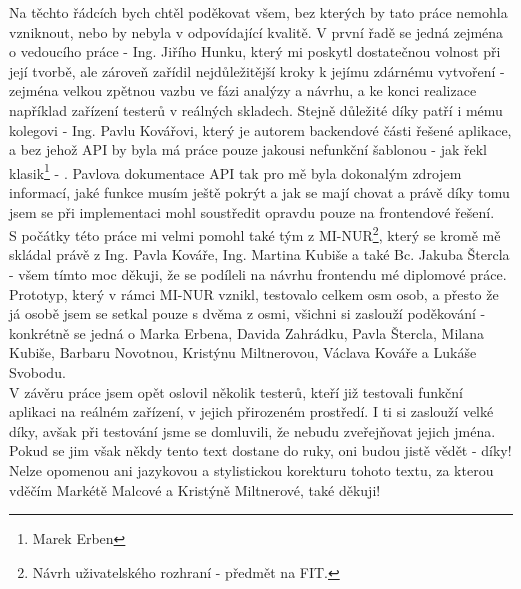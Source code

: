 Na těchto řádcích bych chtěl poděkovat všem, bez kterých by tato práce nemohla vzniknout, nebo by nebyla v odpovídající kvalitě. V první řadě se jedná zejména o vedoucího práce - Ing. Jiřího Hunku, který mi poskytl dostatečnou volnost při její tvorbě, ale zároveň zařídil nejdůležitější kroky k jejímu zdárnému vytvoření - zejména velkou zpětnou vazbu ve fázi analýzy a návrhu, a ke konci realizace například zařízení testerů v reálných skladech. Stejně důležité díky patří i mému kolegovi - Ing. Pavlu Kovářovi, který je autorem backendové části řešené aplikace, a bez jehož API by byla má práce pouze jakousi nefunkční šablonou - jak řekl klasik\footnote{Marek Erben} - . Pavlova dokumentace API tak pro mě byla dokonalým zdrojem informací, jaké funkce musím ještě pokrýt a jak se mají chovat a právě díky tomu jsem se při implementaci mohl soustředit opravdu pouze na frontendové řešení.\\
S počátky této práce mi velmi pomohl také tým z MI-NUR\footnote{Návrh uživatelského rozhraní - předmět na FIT.}, který se kromě mě skládal právě z Ing. Pavla Kováře, Ing. Martina Kubiše a také Bc. Jakuba Štercla - všem tímto moc děkuji, že se podíleli na návrhu frontendu mé diplomové práce. Prototyp, který v rámci MI-NUR vznikl, testovalo celkem osm osob, a přesto že já osobě jsem se setkal pouze s dvěma z osmi, všichni si zaslouží poděkování - konkrétně se jedná o Marka Erbena, Davida Zahrádku, Pavla Štercla, Milana Kubiše, Barbaru Novotnou, Kristýnu Miltnerovou, Václava Kováře a Lukáše Svobodu.\\
V závěru práce jsem opět oslovil několik testerů, kteří již testovali funkční aplikaci na reálném zařízení, v jejich přirozeném prostředí. I ti si zaslouží velké díky, avšak při testování jsme se domluvili, že nebudu zveřejňovat jejich jména. Pokud se jim však někdy tento text dostane do ruky, oni budou jistě vědět - díky!\\
Nelze opomenou ani jazykovou a stylistickou korekturu tohoto textu, za kterou vděčím Markétě Malcové a Kristýně Miltnerové, také děkuji!
